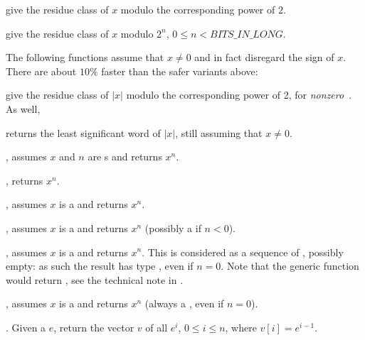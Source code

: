 



 give the residue class of $x$ modulo the
corresponding power of $2$.

 give the residue class of $x$ modulo
$2^n$, $0 \leq n < BITS\_IN\_LONG$.

The following functions assume that $x\neq 0$ and in fact disregard the
sign of $x$. There are about $10\%$ faster than the safer variants above:






 give the residue class of $|x|$ modulo the
corresponding power of 2, for \emph{nonzero}~. As well,

 returns the least significant word of $|x|$, still
assuming that $x\neq 0$.


, assumes $x$ and $n$ are s and
returns $x^n$.

, returns $x^n$.

, assumes $x$ is a  and returns $x^n$.

, assumes $x$ is a  and returns $x^n$
(possibly a  if $n < 0$).

, assumes $x$ is a  and returns
$x^n$. This is considered as a sequence of , possibly empty:
as such the result has type , even if $n = 0$.
Note that the generic function  would return ,
see the technical note in .

, assumes $x$ is a  and returns $x^n$
(always a , even if $n = 0$).

. Given a  $e$, return the vector
$v$ of all $e^i$, $0 \leq i \leq n$, where $v[i] = e^{i-1}$.


